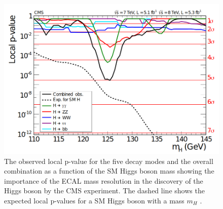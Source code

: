 \begin{figure}[hbtp]
\centering
\includegraphics[scale=0.3]{figures/lhc_and_cms/higgs_observation_cms.png}
\caption{The observed local p-value for the five decay modes and the overall combination as a function of the SM Higgs boson mass showing the importance of the ECAL mass resolution in the discovery of the Higgs boson by the CMS experiment. The dashed line shows the expected local p-values for a SM Higgs boson with a mass $m_{H}$ \cite{cms_higgs}.}
\label{higgs_observation_cms}
\end{figure}